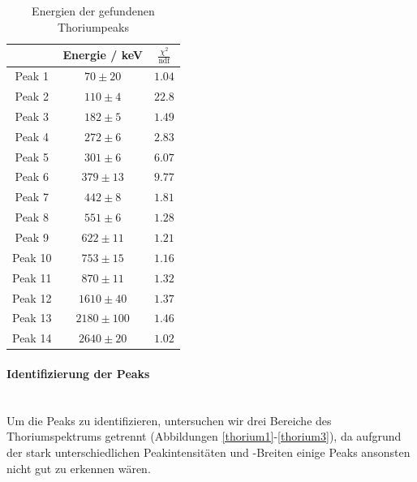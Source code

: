 \documentclass[12pt,listof=totoc]{scrartcl}
\begin{document}
 \begin{table}[h!]
 	\centering
 	\begin{tabular}{c|c|c}
 		&Energie / keV&$\frac{\chi^2}{\text{ndf}}$\\\hline
 		Peak 1&$70\pm20$&$1.04$\\
 		Peak 2&$110\pm4$&$22.8$\\
 		Peak 3&$182\pm 5$&$1.49$\\
 		Peak 4&$272\pm 6$&$2.83$\\
 		Peak 5&$301\pm 6$&$6.07$\\
 		Peak 6&$379\pm 13$&$9.77$\\
 		Peak 7&$442\pm 8$&$1.81$\\
 		Peak 8&$551\pm 6$&$1.28$\\
 		Peak 9&$622\pm 11$&$1.21$\\
 		Peak 10&$753\pm 15$&$1.16$\\
 		Peak 11&$870\pm 11$&$1.32$\\
 		Peak 12&$1610\pm 40$&$1.37$\\
 		Peak 13&$2180\pm 100$&$1.46$\\
 		Peak 14&$2640\pm 20$&$1.02$\\
 	\end{tabular}
 	\caption{Energien der gefundenen Thoriumpeaks\label{thoriumpeaks}}

 \end{table}
 

\newpage
\paragraph{Identifizierung der Peaks}\ \\

Um die Peaks zu identifizieren, untersuchen wir drei Bereiche des Thoriumspektrums getrennt (Abbildungen \ref{thorium1}-\ref{thorium3}), da aufgrund der stark unterschiedlichen Peakintensitäten und -Breiten einige Peaks ansonsten nicht gut zu erkennen wären. 
\end{document}
